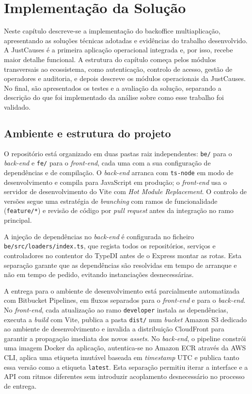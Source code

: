 \chapter{Implementação da Solução}
\label{cap:implementação}

Neste capítulo descreve-se a implementação do backoffice multiaplicação, apresentando as soluções técnicas adotadas e evidências do trabalho desenvolvido. A JustCauses é a primeira aplicação operacional integrada e, por isso, recebe maior detalhe funcional. A estrutura do capítulo começa pelos módulos transversais ao ecossistema, como autenticação, controlo de acesso, gestão de operadores e auditoria, e depois descreve os módulos operacionais da JustCauses. No final, são apresentados os testes e a avaliação da solução, separando a descrição do que foi implementado da análise sobre como esse trabalho foi validado.


\section{Ambiente e estrutura do projeto}
\label{sec:ambiente_infraestrutura}

O repositório está organizado em duas pastas raiz independentes: \texttt{be/} para o \textit{back-end} e \texttt{fe/} para o \textit{front-end}, cada uma com a sua configuração de dependências e de compilação. O \textit{back-end} arranca com \texttt{ts-node} em modo de desenvolvimento e compila para JavaScript em produção; o \textit{front-end} usa o servidor de desenvolvimento do Vite com \textit{Hot Module Replacement}. O controlo de versões segue uma estratégia de \textit{branching} com ramos de funcionalidade (\texttt{feature/*}) e revisão de código por \textit{pull request} antes da integração no ramo principal.

A injeção de dependências no \textit{back-end} é configurada no ficheiro \texttt{be/src/loaders/index.ts}, que regista todos os repositórios, serviços e controladores no contentor do TypeDI antes de o Express montar as rotas. Esta separação garante que as dependências são resolvidas em tempo de arranque e não em tempo de pedido, evitando instanciações desnecessárias.

A entrega para o ambiente de desenvolvimento está parcialmente automatizada com Bitbucket Pipelines, em fluxos separados para o \textit{front-end} e para o \textit{back-end}. No \textit{front-end}, cada atualização ao ramo \texttt{developer} instala as dependências, executa a \textit{build} com Vite, publica a pasta \texttt{dist/} num \textit{bucket} Amazon S3 dedicado ao ambiente de desenvolvimento e invalida a distribuição CloudFront para garantir a propagação imediata dos novos \textit{assets}. No \textit{back-end}, o pipeline constrói uma imagem Docker da aplicação, autentica-se no Amazon ECR através da AWS CLI, aplica uma etiqueta imutável baseada em \textit{timestamp} UTC e publica tanto essa versão como a etiqueta \texttt{latest}. Esta separação permitiu iterar a interface e a \gls{API} com ritmos diferentes sem introduzir acoplamento desnecessário no processo de entrega.

